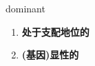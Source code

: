 
\begin{frame}
{\huge dominant}
\begin{center}
\begin{enumerate}\Large
  \item \textbf{处于支配地位的}
  \item \textbf{(基因)显性的}
\end{enumerate}
\end{center}
\end{frame}
